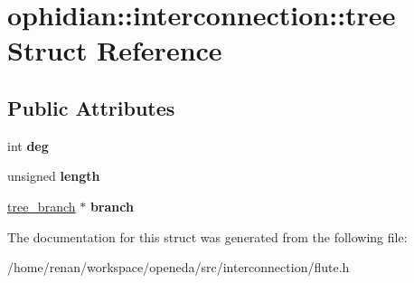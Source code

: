 \hypertarget{structophidian_1_1interconnection_1_1tree}{\section{ophidian\-:\-:interconnection\-:\-:tree Struct Reference}
\label{structophidian_1_1interconnection_1_1tree}
}
\subsection*{Public Attributes}
\begin{DoxyCompactItemize}
\item 
\hypertarget{structophidian_1_1interconnection_1_1tree_a5a83b4cd9026c954806e5ef76955f58a}{int {\bfseries deg}}\label{structophidian_1_1interconnection_1_1tree_a5a83b4cd9026c954806e5ef76955f58a}

\item 
\hypertarget{structophidian_1_1interconnection_1_1tree_a7930eab96660246aa70fcf9e26c2b203}{unsigned {\bfseries length}}\label{structophidian_1_1interconnection_1_1tree_a7930eab96660246aa70fcf9e26c2b203}

\item 
\hypertarget{structophidian_1_1interconnection_1_1tree_ad74447a3f65a5ec228a976da7ed955e2}{\hyperlink{structophidian_1_1interconnection_1_1tree__branch}{tree\-\_\-branch} $\ast$ {\bfseries branch}}\label{structophidian_1_1interconnection_1_1tree_ad74447a3f65a5ec228a976da7ed955e2}

\end{DoxyCompactItemize}


The documentation for this struct was generated from the following file\-:\begin{DoxyCompactItemize}
\item 
/home/renan/workspace/openeda/src/interconnection/flute.\-h\end{DoxyCompactItemize}
